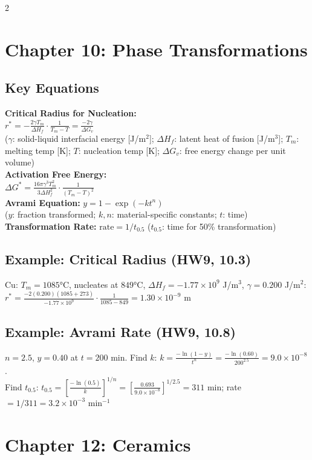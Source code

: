 \documentclass[8pt]{extarticle}
\begin{document}
\begin{multicols*}{2}
\section*{Chapter 10: Phase Transformations}
\subsection*{Key Equations}
\textbf{Critical Radius for Nucleation:} \\
$r^* = -\frac{2\gamma T_m}{\Delta H_f}\cdot\frac{1}{T_m - T} = \frac{-2\gamma}{\Delta G_v}$ \\
($\gamma$: solid-liquid interfacial energy [J/m$^2$]; $\Delta H_f$: latent heat of fusion [J/m$^3$]; $T_m$: melting temp [K]; $T$: nucleation temp [K]; $\Delta G_v$: free energy change per unit volume) \\
\textbf{Activation Free Energy:} \\
$\Delta G^* = \frac{16\pi\gamma^3 T_m^2}{3\Delta H_f^2}\cdot\frac{1}{(T_m-T)^2}$ \\
\textbf{Avrami Equation:} $y = 1 - \exp(-kt^n)$ \\
($y$: fraction transformed; $k,n$: material-specific constants; $t$: time) \\
\textbf{Transformation Rate:} $\mathrm{rate} = 1/t_{0.5}$ \quad ($t_{0.5}$: time for 50\% transformation)
\subsection*{Example: Critical Radius (HW9, 10.3)}
Cu: $T_m=1085$°C, nucleates at $849$°C, $\Delta H_f=-1.77\times10^9$ J/m$^3$, $\gamma=0.200$ J/m$^2$: \\
$r^* = \frac{-2(0.200)(1085+273)}{-1.77\times10^9}\cdot\frac{1}{1085-849} = 1.30\times10^{-9}$ m
\subsection*{Example: Avrami Rate (HW9, 10.8)}
$n=2.5$, $y=0.40$ at $t=200$ min. Find $k$: $k = \frac{-\ln(1-y)}{t^n} = \frac{-\ln(0.60)}{200^{2.5}} = 9.0\times10^{-8}$. \\
Find $t_{0.5}$: $t_{0.5} = \left[\frac{-\ln(0.5)}{k}\right]^{1/n} = \left[\frac{0.693}{9.0\times10^{-8}}\right]^{1/2.5} = 311$ min; rate $= 1/311 = 3.2\times10^{-3}$ min$^{-1}$

\section*{Chapter 12: Ceramics}

\end{multicols*}
\end{document}
